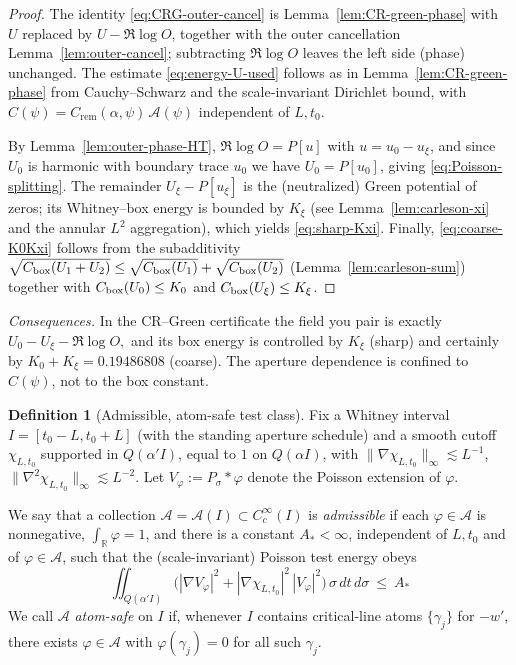 \documentclass[11pt]{article}
\providecommand{\CboxZeta}{K_0 + K_\xi}%
\renewcommand{\CboxZeta}{0.19486808}
\theoremstyle{definition}
\newtheorem{definition}[theorem]{Definition}
\theoremstyle{remark}
\newcommand{\R}{\mathbb{R}}
\newcommand{\Poisson}{P}
\begin{document}
\begin{proof}
The identity \eqref{eq:CRG-outer-cancel} is Lemma~\ref{lem:CR-green-phase} with $U$ replaced by $U-\Re\log O$, together with the outer cancellation Lemma~\ref{lem:outer-cancel}; subtracting $\Re\log O$ leaves the left side (phase) unchanged. The estimate \eqref{eq:energy-U-used} follows as in Lemma~\ref{lem:CR-green-phase} from Cauchy--Schwarz and the scale‑invariant Dirichlet bound, with $C(\psi)=C_{\mathrm{rem}}(\alpha,\psi)\,\mathcal A(\psi)$ independent of $L,t_0$.

By Lemma~\ref{lem:outer-phase-HT}, $\Re\log O=\Poisson[u]$ with $u=u_0-u_\xi$, and since $U_0$ is harmonic with boundary trace $u_0$ we have $U_0=\Poisson[u_0]$, giving \eqref{eq:Poisson-splitting}. The remainder $U_\xi-\Poisson[u_\xi]$ is the (neutralized) Green potential of zeros; its Whitney–box energy is bounded by $K_\xi$ (see Lemma~\ref{lem:carleson-xi} and the annular $L^2$ aggregation), which yields \eqref{eq:sharp-Kxi}. Finally, \eqref{eq:coarse-K0Kxi} follows from the subadditivity
\(
\sqrt{C_{\rm box}(U_1+U_2)}\le \sqrt{C_{\rm box}(U_1)}+\sqrt{C_{\rm box}(U_2)}
\)
(Lemma~\ref{lem:carleson-sum}) together with $C_{\rm box}(U_0)\le K_0$ and $C_{\rm box}(U_\xi)\le K_\xi$.
\end{proof}

\noindent\emph{Consequences.}
In the CR–Green certificate the field you pair is exactly
\(
U_0-U_\xi-\Re\log O,
\)
and its box energy is controlled by $K_\xi$ (sharp) and certainly by $K_0+K_\xi=\CboxZeta$ (coarse).
The aperture dependence is confined to $C(\psi)$, not to the box constant.


\begin{definition}[Admissible, atom-safe test class]\label{def:admissible-class}
Fix a Whitney interval \(I=[t_0-L,t_0+L]\) (with the standing aperture schedule)
and a smooth cutoff \(\chi_{L,t_0}\) supported in \(Q(\alpha'I)\), equal to \(1\) on \(Q(\alpha I)\), with
\(\|\nabla\chi_{L,t_0}\|_\infty\lesssim L^{-1}\), \(\|\nabla^2\chi_{L,t_0}\|_\infty\lesssim L^{-2}\).
Let \(V_\varphi:=P_\sigma*\varphi\) denote the Poisson extension of \(\varphi\).


We say that a collection \(\mathcal A=\mathcal A(I)\subset C_c^\infty(I)\) is \emph{admissible}
if each \(\varphi\in\mathcal A\) is nonnegative, \(\int_{\R}\varphi=1\), and there is a constant \(A_\ast<\infty\),
independent of \(L,t_0\) and of \(\varphi\in\mathcal A\), such that the (scale-invariant) Poisson test energy obeys
\begin{equation}\label{eq:Poisson-energy-bound}
  \iint_{Q(\alpha'I)} \Big(|\nabla V_\varphi|^2 + |\nabla\chi_{L,t_0}|^2\,|V_\varphi|^2\Big)\,\sigma\,dt\,d\sigma
  \ \le\ A_\ast
\end{equation}
We call \(\mathcal A\) \emph{atom-safe} on \(I\) if, whenever \(I\) contains critical-line atoms \(\{\gamma_j\}\) for \(-w'\),
there exists \(\varphi\in\mathcal A\) with \(\varphi(\gamma_j)=0\) for all such \(\gamma_j\).
\end{definition}
\end{document}
